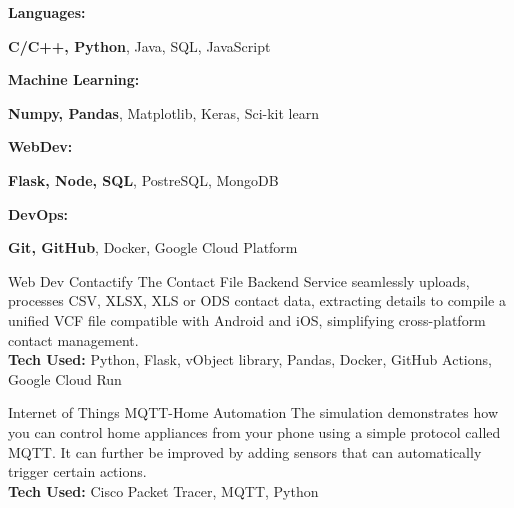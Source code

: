 \documentclass[9pt]{developercv}
\begin{document}
\vspace{-5pt}
\vspace{-10pt}

\begin{minipage}[t]{0.2\textwidth}
  \textbf{Languages:}
\end{minipage}
\hfill
\begin{minipage}[t]{0.73\textwidth}
  \textbf{C/C++, Python}, Java, SQL, JavaScript
\end{minipage}
\vspace{2mm}

\begin{minipage}[t]{0.2\textwidth}
  \textbf{Machine Learning:}
\end{minipage}
\hfill
\begin{minipage}[t]{0.73\textwidth}
  \textbf{Numpy, Pandas}, Matplotlib, Keras, Sci-kit learn
\end{minipage}
\vspace{2mm}

\begin{minipage}[t]{0.2\textwidth}
  \textbf{WebDev:}
\end{minipage}
\hfill
\begin{minipage}[t]{0.73\textwidth}
  \textbf{Flask, Node, SQL}, PostreSQL, MongoDB
\end{minipage}
\vspace{2mm}

\begin{minipage}[t]{0.2\textwidth}
  \textbf{DevOps:}
\end{minipage}
\hfill
\begin{minipage}[t]{0.73\textwidth}
  \textbf{Git, GitHub}, Docker, Google Cloud Platform
\end{minipage}



\vspace{-5pt}
\vspace{-6pt}
\begin{entrylist}
  \entry
  {Web Dev}
  {Contactify}
  {}
  {The Contact File Backend Service seamlessly uploads, processes CSV, XLSX, XLS or ODS contact data,   extracting
    details to compile a unified VCF file compatible with Android and iOS, simplifying cross-platform contact management.\\
    \textbf{Tech Used: } Python, Flask, vObject library, Pandas, Docker, GitHub Actions, Google Cloud Run
  }

  \entry
  {Internet of Things}
  {MQTT-Home Automation}
  {}
  {The simulation demonstrates how you can control home appliances from your phone using a simple protocol called MQTT. It can further be improved by adding sensors that can automatically trigger certain actions.\\
    \textbf{Tech Used: } Cisco Packet Tracer, MQTT, Python
  }

\end{entrylist}
\end{document}

